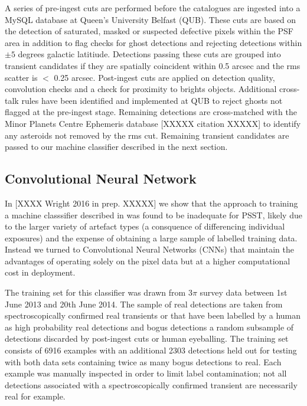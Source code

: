 \documentclass[a4paper,fleqn,usenatbib]{mnras}
\begin{document}
A series of pre-ingest cuts are performed before the catalogues are ingested into a MySQL database at Queen's University Belfast (QUB).  These cuts are based on the detection of saturated, masked or suspected defective pixels within the PSF area in addition to flag checks for ghost detections and rejecting detections within $\pm 5$ degrees galactic latitiude. Detections passing these cuts are grouped into transient candidates if they are spatially coincident within 0.5 arcsec and the rms scatter is $<$ 0.25 arcsec.  Post-ingest cuts are applied on detection quality, convolution checks and a check for proximity to brights objects.  Additional cross-talk rules have been identified and implemented at QUB to reject ghosts
not flagged at the pre-ingest stage.  Remaining detections are cross-matched with the Minor Planets Centre Ephemeris database [XXXXX citation XXXXX] to identify any asteroids not 
removed by the rms cut.  Remaining transient candidates are passed to our machine classifier described in the next section.

\subsection{Convolutional Neural Network}
\label{sec:cnn}

In [XXXX Wright 2016 in prep. XXXXX] we show that the approach to training a machine classsifier described in \citet{Wright15} was found to be inadequate for PSST, likely due to the larger variety of artefact types (a consquence of differencing individual exposures) and the expense of obtaining a large sample of labelled training data.  Instead we turned to Convolutional Neural Networks (CNNs) that maintain the advantages of operating solely on the pixel data but at a higher computational cost in deployment.  

The training set for this classifier was drawn from $3\pi$ survey data between 1st June 2013 and 20th June 2014.  The sample of real detections are taken from spectroscopically confirmed real transients or that have been labelled by a human as high probability real detections and bogus detections a random subsample of detections discarded by post-ingest cuts or human eyeballing.  The training set consists of 6916 examples with an additional 2303 detections held out for testing with both data sets containing twice as many bogus detections to real. Each example was manually inspected in order to limit label contamination; not all detections associated with a spectroscopically confirmed transient are necessarily real for example.
\end{document}
